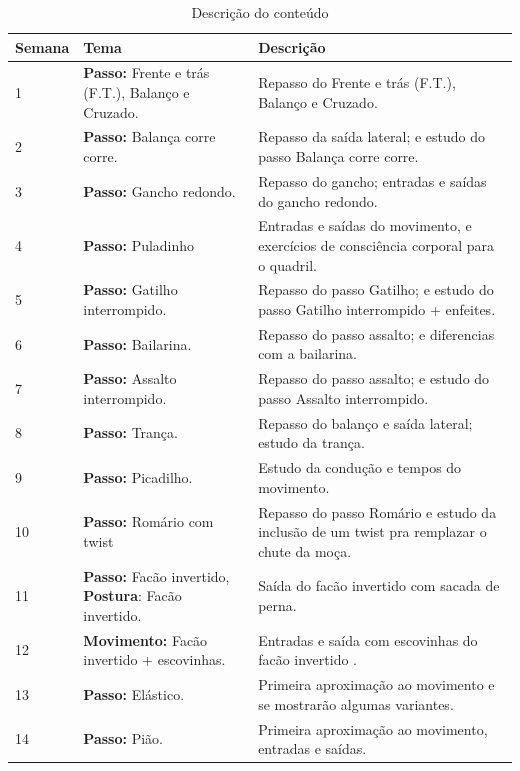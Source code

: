 \documentclass{article}
\begin{document}
\begin{table}[h]
\centering
\begin{tabular}{|p{1.5cm}|p{5cm}|p{9cm}|}
\hline
Semana & Tema & Descrição \\  \hline \hline
1 &  \textbf{Passo:} Frente e trás (F.T.), Balanço e Cruzado. &  Repasso do Frente e trás (F.T.), Balanço e Cruzado.\\ \hline
2 &  \textbf{Passo:} Balança corre corre. &  Repasso da saída lateral; e estudo do passo Balança corre corre.\\ \hline
3 &  \textbf{Passo:} Gancho redondo. &  Repasso do gancho; entradas e saídas do gancho redondo.\\ \hline
4 &  \textbf{Passo:} Puladinho &Entradas e saídas do movimento, e exercícios de consciência corporal para o quadril.\\ \hline \hline
5 &  \textbf{Passo:} Gatilho interrompido. &  Repasso do passo Gatilho; e estudo do passo Gatilho interrompido + enfeites.\\ \hline
6 &  \textbf{Passo:} Bailarina. &  Repasso do passo assalto; e diferencias com a bailarina.\\ \hline
7 &  \textbf{Passo:} Assalto interrompido. &  Repasso do passo assalto; e estudo do passo Assalto interrompido.\\ \hline
8 &  \textbf{Passo:} Trança. &  Repasso do balanço e saída lateral; estudo da trança.\\ \hline \hline
9 &  \textbf{Passo:} Picadilho. &  Estudo da condução e tempos do movimento.\\ \hline
10&  \textbf{Passo:} Romário com twist &  Repasso do passo Romário e estudo da inclusão de um twist pra remplazar o chute da moça. \\ \hline
11&  \textbf{Passo:} Facão invertido, \textbf{Postura}: Facão invertido. & Saída do facão invertido com sacada de perna. \\ \hline
12&  \textbf{Movimento:} Facão invertido + escovinhas. & Entradas e saída com escovinhas do facão invertido . \\ \hline \hline
13&  \textbf{Passo:} Elástico. &  Primeira aproximação ao movimento e se mostrarão algumas variantes.\\ \hline
14&  \textbf{Passo:} Pião. &  Primeira aproximação ao movimento, entradas e saídas.\\ \hline


\end{tabular}
\caption{Descrição do conteúdo}
\label{tab:myfirsttable}
\end{table}
\end{document}
